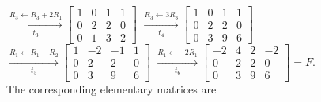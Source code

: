 \begin{enumerate}[label=\alph*)]
\begin{answer}
        $\xrightarrow[t_3]{R_3 \leftarrow R_3+2R_1}
        \begin{bmatrix}
            1 & 0 & 1 & 1 \\
            0 & 2 & 2 & 0 \\
            0 & 1 & 3 & 2
        \end{bmatrix}
        $
        $\xrightarrow[t_4]{R_3 \leftarrow 3R_3}
        \begin{bmatrix}
            1 & 0 & 1 & 1 \\
            0 & 2 & 2 & 0 \\
            0 & 3 & 9 & 6
        \end{bmatrix}
        $ \\[1.0em]

        $\xrightarrow[t_5]{R_1 \leftarrow R_1-R_2}
        \begin{bmatrix}
            1 & -2 & -1 & 1 \\
            0 &  2 &  2 & 0 \\
            0 &  3 &  9 & 6
        \end{bmatrix}
        $
        $\xrightarrow[t_6]{R_1 \leftarrow -2R_1}
        \begin{bmatrix}
            -2 & 4 & 2 & -2 \\
            0 & 2 & 2 &  0 \\
            0 & 3 & 9 &  6
        \end{bmatrix}
        =F.
        $ \\[1.0em]

        The corresponding elementary matrices are


\end{answer}
\end{enumerate}
